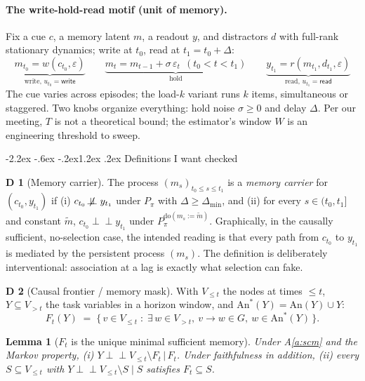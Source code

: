 \documentclass[10pt]{article}
\makeatletter
\newcommand{\indep}{\perp\!\!\!\perp}
\newcommand{\nindep}{\not\!\perp\!\!\!\perp}
\newcommand{\Do}{\mathrm{do}}
\newcommand{\An}{\mathrm{An}}
\newcommand{\past}{V_{\le t}}
\newcommand{\future}{V_{> t}}
\renewcommand\section{\@startsection{section}{1}{\z@}%
  {-2.2ex \@plus -.6ex \@minus -.2ex}{1.2ex \@plus .2ex}%
  {\normalfont\large\bfseries}}
\theoremstyle{plain}
\newtheorem{lemma}{Lemma}
\theoremstyle{definition}
\newtheorem{definitionx}{D}
\makeatother
\begin{document}
\paragraph{The write-hold-read motif (unit of memory).}
Fix a cue $c$, a memory latent $m$, a readout $y$, and distractors $d$ with full-rank stationary dynamics; write at $t_0$, read at $t_1 = t_0 + \Delta$:
\[
\underbrace{m_{t_0} = w(c_{t_0}, \varepsilon)}_{\text{write, } u_{t_0} = \mathsf{write}}
\qquad
\underbrace{m_t = m_{t-1} + \sigma\,\varepsilon_t \ \ (t_0 < t < t_1)}_{\text{hold}}
\qquad
\underbrace{y_{t_1} = r(m_{t_1}, d_{t_1}, \varepsilon)}_{\text{read, } u_{t_1} = \mathsf{read}}
\]
The cue varies across episodes; the load-$k$ variant runs $k$ items, simultaneous or staggered. Two knobs organize everything: hold noise $\sigma \ge 0$ and delay $\Delta$. Per our meeting, $T$ is not a theoretical bound; the estimator's window $W$ is an engineering threshold to sweep.

\section{Definitions I want checked}\label{sec:defs}

\begin{definitionx}[Memory carrier]\label{def:carrier}
The process $(m_s)_{t_0 \le s \le t_1}$ is a \emph{memory carrier} for $(c_{t_0}, y_{t_1})$ if
(i) $c_{t_0} \nindep y_{t_1}$ under $P_\pi$ with $\Delta \ge \Delta_{\min}$, and
(ii) for every $s \in (t_0, t_1]$ and constant $\tilde m$, $c_{t_0} \indep y_{t_1}$ under $P_\pi^{\Do(m_s := \tilde m)}$.
Graphically, in the causally sufficient, no-selection case, the intended reading is that every path from $c_{t_0}$ to $y_{t_1}$ is mediated by the persistent process $(m_s)$. The definition is deliberately interventional: association at a lag is exactly what selection can fake.
\end{definitionx}

\begin{definitionx}[Causal frontier / memory mask]\label{def:frontier}
With $\past$ the nodes at times $\le t$, $Y \subseteq \future$ the task variables in a horizon window, and $\An^*(Y) = \An(Y) \cup Y$:
\[
F_t(Y) \;=\; \big\{\, v \in \past \;:\; \exists\, w \in \future,\ v \to w \in G,\ w \in \An^*(Y) \,\big\}.
\]
\end{definitionx}

\begin{lemma}[$F_t$ is the unique minimal sufficient memory]\label{lem:frontier}
Under A\ref{a:scm} and the Markov property, \emph{(i)} $Y \indep \past \setminus F_t \,\big|\, F_t$. Under faithfulness in addition, \emph{(ii)} every $S \subseteq \past$ with $Y \indep \past \setminus S \mid S$ satisfies $F_t \subseteq S$.
\end{lemma}
\end{document}
